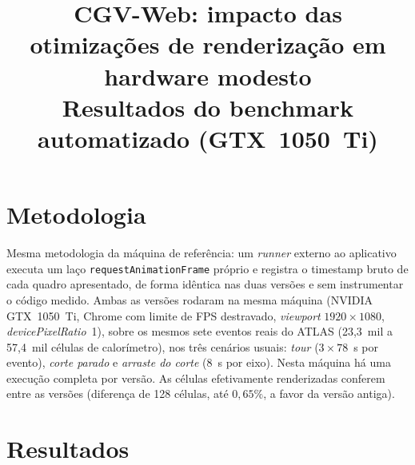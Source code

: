 \documentclass[11pt,a4paper]{article}
\title{CGV-Web: impacto das otimiza\c{c}\~oes de renderiza\c{c}\~ao em hardware modesto\\ \large Resultados do benchmark automatizado (GTX~1050~Ti)}
\author{}
\date{}
\begin{document}
\maketitle

\section{Metodologia}

Mesma metodologia da m\'aquina de refer\^encia: um \emph{runner} externo ao aplicativo executa
um la\c{c}o \texttt{request\-Animation\-Frame} pr\'oprio e registra o timestamp bruto de cada
quadro apresentado, de forma id\^entica nas duas vers\~oes e sem instrumentar o c\'odigo medido.
Ambas as vers\~oes rodaram na mesma m\'aquina (NVIDIA GTX~1050~Ti, Chrome com limite de FPS
destravado, \emph{viewport} $1920\times1080$, \emph{devicePixelRatio}~1), sobre os mesmos sete
eventos reais do ATLAS (23{,}3~mil a 57{,}4~mil c\'elulas de calor\'imetro), nos tr\^es
cen\'arios usuais: \emph{tour} ($3\times78$~s por evento), \emph{corte parado} e \emph{arraste
do corte} (8~s por eixo). Nesta m\'aquina h\'a uma execu\c{c}\~ao completa por vers\~ao. As
c\'elulas efetivamente renderizadas conferem entre as vers\~oes (diferen\c{c}a de 128 c\'elulas,
at\'e $0{,}65\%$, a favor da vers\~ao antiga).

\section{Resultados}
\end{document}
